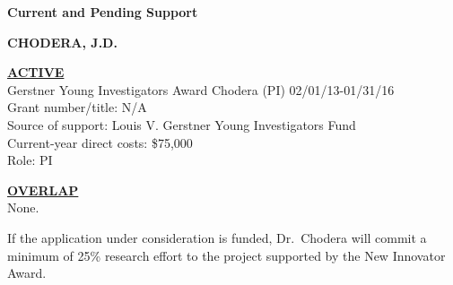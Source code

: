 \documentclass[11pt]{article}
\begin{document}

{\bf \Large Current and Pending Support}

{\bf CHODERA, J.D.}

{\bf \underline{ACTIVE}}\\
Gerstner Young Investigators Award	\hskip 1in Chodera (PI) \hskip 1in 02/01/13-01/31/16\\
Grant number/title: N/A\\
Source of support: Louis V. Gerstner Young Investigators Fund\\
Current-year direct costs: \$75,000\\
Role: PI

{\bf \underline{OVERLAP}}\\
None.

If the application under consideration is funded, Dr.~Chodera will commit a minimum of 25\% research effort to the project supported by the New Innovator Award.
\end{document}
